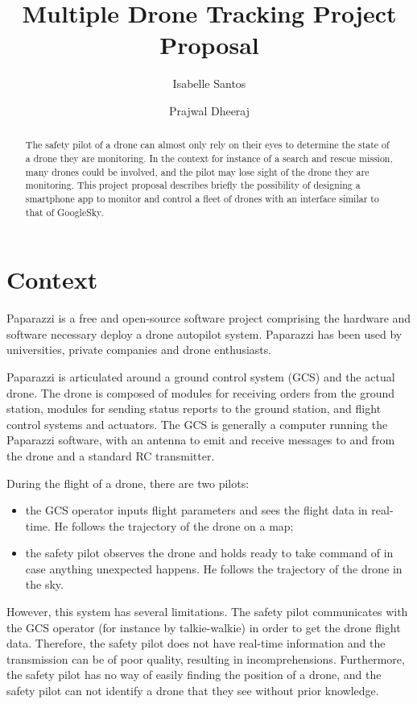\documentclass[10pt,letterpaper]{article}
\author{Isabelle Santos \and Prajwal Dheeraj}
\title{Multiple Drone Tracking Project Proposal}
\begin{document}
\maketitle
\begin{abstract}
The safety pilot of a drone can almost only rely on their eyes to determine the state of a drone they are monitoring. In the context for instance of a search and rescue mission, many drones could be involved, and the pilot may lose sight of the drone they are monitoring. This project proposal describes briefly the possibility of designing a smartphone app to monitor and control a fleet of drones with an interface similar to that of GoogleSky.
\end{abstract}

\section{Context}
Paparazzi is a free and open-source software project \cite{Paparazzi} comprising the hardware and software necessary deploy a drone autopilot system. Paparazzi has been used by universities, private companies and drone enthusiasts. 

Paparazzi is articulated around a ground control system (GCS) and the actual drone. The drone is composed of modules for receiving orders from the ground station, modules for sending status reports to the ground station, and flight control systems and actuators. The GCS is generally a computer running the Paparazzi software, with an antenna to emit and receive messages to and from the drone and a standard RC transmitter. 

During the flight of a drone, there are two pilots:
\begin{itemize}
\item the GCS operator inputs flight parameters and sees the flight data in real-time. He follows the trajectory of the drone on a map;
\item the safety pilot observes the drone and holds ready to take command of in case anything unexpected happens. He follows the trajectory of the drone in the sky. 
\end{itemize}

However, this system has several limitations. The safety pilot communicates with the GCS operator (for instance by talkie-walkie) in order to get the drone flight data. Therefore, the safety pilot does not have real-time information and the transmission can be of poor quality, resulting in incomprehensions. Furthermore, the safety pilot has no way of easily finding the position of a drone, and the safety pilot can not identify a drone that they see without prior knowledge.
\end{document}
